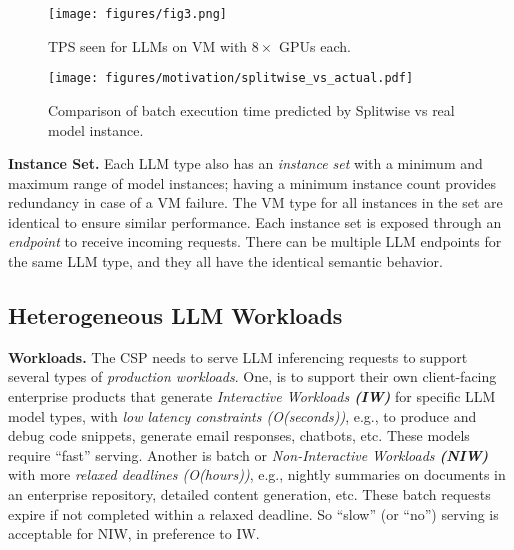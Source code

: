 \begin{figure}[t!]
    \centering
\texttt{[image: figures/fig3.png]}
    \caption{TPS seen for LLMs on VM with $8\times$ GPUs each.
    }
    \label{fig:tps-real-deployment}
\texttt{[image: figures/motivation/splitwise\_vs\_actual.pdf]}
    \caption{Comparison of batch execution time predicted by Splitwise vs real model instance.
    }
    \label{fig:splitwise_cs_actual}
\end{figure}

\textbf{Instance Set. }Each LLM type also has an \textit{instance set} with a minimum and maximum range of model instances;
having a minimum instance count provides redundancy in case of a VM failure. The VM type for all instances in the set are identical to ensure similar performance.
Each instance set is exposed through an \textit{endpoint} to receive incoming requests. There can be multiple LLM endpoints for the same LLM type, 
and they all have the identical semantic behavior. 


\subsection{Heterogeneous LLM Workloads}
\textbf{Workloads. }The CSP needs to serve LLM inferencing requests to support several types of \textit{production workloads}.  One, is to support their own client-facing enterprise products that generate \textit{Interactive Workloads \textbf{(IW)}} for specific LLM model types, with \textit{low latency constraints (O(seconds))}, e.g., to produce and debug code snippets, generate email responses, chatbots, etc. These models require ``fast'' serving. Another is batch or \textit{Non-Interactive Workloads \textbf{(NIW)}} with more \textit{relaxed deadlines (O(hours))}, e.g., 
nightly summaries on documents in an enterprise repository, detailed content generation, etc.
These batch requests expire if not completed within a relaxed deadline.
So ``slow'' (or ``no'') serving is acceptable for NIW, in preference to IW.


